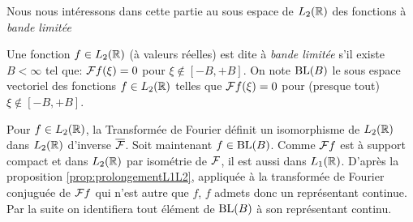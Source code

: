 Nous nous int{\'e}ressons dans cette partie au sous espace de $L_2(\mathbb{R})$ des fonctions {\`a} \emph{bande limit{\'e}e}
\begin{definition}
Une fonction $f \in L_2(\mathbb{R})$ ({\`a} valeurs r{\'e}elles) est dite {\`a} \emph{bande limit{\'e}e} s'il existe $B < \infty$ tel que: $\mathcal{F} f(\xi) = 0$ pour $\xi \not \in [-B,+B]$.
On note $\mathrm{BL}(B)$ le sous espace vectoriel des fonctions $f \in L_2(\mathbb{R})$ telles que $\mathcal{F} f(\xi) = 0$ pour (presque tout) $\xi \not \in [-B,+B]$.
\end{definition}
Pour $f \in L_2(\mathbb{R})$, la Transform{\'e}e de Fourier d{\'e}finit un isomorphisme de $L_2(\mathbb{R})$ dans $L_2(\mathbb{R})$
d'inverse $\overline{\mathcal{F}}$. Soit maintenant  $f \in \mathrm{BL}(B)$.
Comme $\mathcal{F} f$ est {\`a} support compact et dans $L_2(\mathbb{R})$ par isom{\'e}trie de $\mathcal{F}$, il est aussi dans $L_1(\mathbb{R})$.
D'apr{\`e}s la proposition \ref{prop:prolongementL1L2}, appliqu{\'e}e {\`a} la transform{\'e}e de Fourier conjugu{\'e}e de $\mathcal{F} f$ qui n'est
autre que $f$, $f$ admets donc un repr{\'e}sentant continue. Par la suite on identifiera tout {\'e}l{\'e}ment de $\mathrm{BL}(B)$
{\`a} son repr{\'e}sentant continu.



